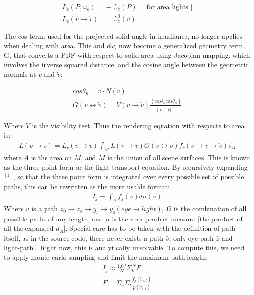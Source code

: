 \message{ !name(test.tex)}\documentclass{article}
\begin{document}
  \begin{align}
    L_e(P, \omega_o) &\equiv L_e(P) &\text{[ for area lights ]}\\
    L_e(v \rightarrow \dot{v}) &= L_e^0(v)&
  \end{align}

    The cos term, used for the projected solid angle in irradiance, no longer
    applies when dealing with area. This and $d\omega_i$ now become a
    generalized geometry term, G, that converts a PDF with respect to solid area
    using Jacobian mapping, which involves the inverse squared distance, and the
    cosine angle between the geometric normals at $v$ and $\dot{v}$:

  \begin{align}
    cos\theta_n = v \cdot N(v) \\
    G(v \leftrightarrow \dot{v}) = V(v \rightarrow \dot{v})
        \frac{(cos\theta_n cos\dot{\theta_n})}{|| v - \dot{v}||^2}
  \end{align}

    Where $V$ is the visibility test. Thus the rendering equation with respects
    to area is:
  \begin{align}
    L(v \rightarrow \dot{v}) = L_e(v \rightarrow \dot{v}) \int_ML(v \rightarrow
    \dot{v}) G(v\leftrightarrow \dot{v}) f_s(v\rightarrow \dot{v} \rightarrow
    \ddot{v}) d_A
  \end{align}
    where $A$ is the area on $M$, and $M$ is the union of all scene surfaces.
    This is known as the three-point form or the light transport equation. By
    recursively expanding$^{[1]}$, so that the three point form is integrated
    over every possible set of possible paths, this can be rewritten as the more
    usable format:
  \begin{align} I_j = \int_\Omega f_j(\bar{v}) d\mu(\bar{v}) \end{align}
    Where $\bar{v}$ is a path $z_0\rightarrow z_s \rightarrow y_t \rightarrow
    y_0 (eye \rightarrow light)$, $\Omega$ is the combination of all possible
    paths of any length, and $\mu$ is the area-product measure [the product of
    all the expanded $d_A$]. Special care has to be taken with the definition of
    path itself, as in the source code, there never exists a path $\bar{v}$,
    only eye-path $\bar{z}$ and light-path . Right now, this is analytically
    unsolvable. To compute this, we need to apply monte carlo sampling and limit
    the maximum path length:
  \begin{align}
    I_j \approx \frac{1.0f}{N}\Sigma_0^NF\\
    F = \Sigma_s\Sigma_t\frac{f_j(\bar{v}_{s, t})}{p(\bar{v}_{s, t})}
  \end{align}
\end{document}
